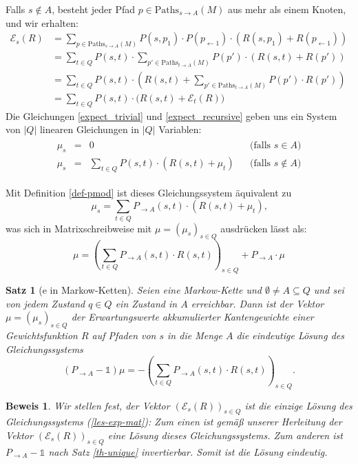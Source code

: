 \documentclass[a4paper]{article}
\newcommand{\mc}{Markow-Kette}
\newtheorem{satz}{Satz}[section] %
\theoremstyle{nonumberplain}
\newtheorem{beweis}{Beweis}
\begin{document}
Falls $s \notin A$, besteht jeder Pfad $p \in \mathrm{Paths}_{s \rightarrow A}(M)$ aus mehr als einem Knoten, und wir erhalten:
\begin{align}
	\mathcal{E}_{s}(R) & = \sum_{p \in \mathrm{Paths}_{s \rightarrow A}(M)}{P(s,p_1) \cdot P(p_{\leftarrow 1}) \cdot (R(s,p_1) + R(p_{\leftarrow 1}))} \\
	& = \sum_{t \in Q}{ P(s,t) \cdot \sum_{p' \in \mathrm{Paths}_{t \rightarrow A}(M)}{ P(p') \cdot (R(s,t) + R(p')) } } \\
	& = \sum_{t \in Q}{ P(s,t) \cdot \left(R(s,t) + \sum_{p' \in \mathrm{Paths}_{t \rightarrow A}(M)}{ P(p') \cdot R(p') } \right) } \\
	& = \sum_{t \in Q}{ P(s,t) \cdot \big(R(s,t) + \mathcal{E}_{t}(R) \big) } \label{expect_recursive}
\end{align}
Die Gleichungen \ref{expect_trivial} und \ref{expect_recursive} geben uns ein System von $|Q|$ linearen Gleichungen in $|Q|$ Variablen:
\begin{align}
\begin{aligned}
	\mu_{s} & = & 0 && \text{(falls $s \in A$)} \\
	\mu_{s} & = & \sum_{t \in Q}{ P(s,t) \cdot \left(R(s,t) + \mu_{t} \right) } && \text{(falls $s \notin A$)}
\end{aligned}\label{les-exp}
\end{align}

Mit Definition \ref{def-pmod} ist dieses Gleichungssystem äquivalent zu
\begin{equation}
	\mu_s = \sum_{t \in Q}{ P_{\rightarrow A}(s,t) \cdot \left(R(s,t) + \mu_{t} \right) }\text{,}
\end{equation}
was sich in Matrixschreibweise mit $\mu = (\mu_s)_{s \in Q }$ ausdrücken lässt als:
\begin{equation}
\mu = \left(\sum_{t \in Q}{ P_{\rightarrow A}(s,t) \cdot R(s,t) }\right)_{s \in Q} + P_{\rightarrow A} \cdot \mu 
\end{equation}
\begin{satz}[\expect{}e in \mc{}n]\label{th-exp}
	Seien \mcex{} eine \mc{} und $\emptyset \neq A\subseteq Q$ und sei von jedem Zustand $q\in Q$ ein Zustand in $A$ erreichbar. Dann ist der Vektor $\mu = (\mu_s)_{s \in Q }$ der Erwartungswerte akkumulierter Kantengewichte einer Gewichtsfunktion $R$ auf Pfaden von $s$ in die Menge $A$ die eindeutige Lösung des Gleichungssystems	
	 \begin{equation}
	 (P_{\rightarrow A} - \mathbb{1}) \mu = - \left(\sum_{t \in Q}{ P_{\rightarrow A}(s,t) \cdot R(s,t) }\right)_{s \in Q}\text{.}\label{les-exp-mat}
	 \end{equation}
\end{satz}
\begin{beweis}
Wir stellen fest, der Vektor $(\mathcal{E}_{s}(R))_{s \in Q}$ ist die einzige Lösung des Gleichungssystems (\ref{les-exp-mat}):
Zum einen ist gemäß unserer Herleitung der Vektor $(\mathcal{E}_{s}(R))_{s \in Q}$ eine Lösung dieses Gleichungssystems. Zum anderen ist $P_{\rightarrow A} - \mathbb{1}$ nach Satz \ref{th-unique} invertierbar. Somit ist die Lösung eindeutig.
\end{beweis}
\end{document}
